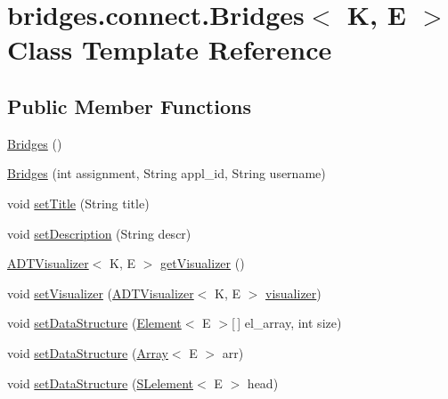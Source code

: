 \hypertarget{classbridges_1_1connect_1_1_bridges}{}\section{bridges.\+connect.\+Bridges$<$ K, E $>$ Class Template Reference}
\label{classbridges_1_1connect_1_1_bridges}
\subsection*{Public Member Functions}
\begin{DoxyCompactItemize}
\item 
\hyperlink{classbridges_1_1connect_1_1_bridges_a4925cf146eff9ff84e89351ab574795d}{Bridges} ()
\item 
\hyperlink{classbridges_1_1connect_1_1_bridges_a297e7ca95c725fa20bce0768c2d9aa64}{Bridges} (int assignment, String appl\+\_\+id, String username)
\item 
void \hyperlink{classbridges_1_1connect_1_1_bridges_a90c7f6b2b99d88bf241ea7247db47045}{set\+Title} (String title)
\item 
void \hyperlink{classbridges_1_1connect_1_1_bridges_a161206b37c2acdf435f4444679616eec}{set\+Description} (String descr)
\item 
\hyperlink{classbridges_1_1base_1_1_a_d_t_visualizer}{A\+D\+T\+Visualizer}$<$ K, E $>$ \hyperlink{classbridges_1_1connect_1_1_bridges_a7193b48c9dc01b04dfcf0d66fa2f59fb}{get\+Visualizer} ()
\item 
void \hyperlink{classbridges_1_1connect_1_1_bridges_ad627f604914734646e92fac9e7b385d8}{set\+Visualizer} (\hyperlink{classbridges_1_1base_1_1_a_d_t_visualizer}{A\+D\+T\+Visualizer}$<$ K, E $>$ \hyperlink{classbridges_1_1connect_1_1_bridges_af3fc35779b31c976ed8bf2e173310502}{visualizer})
\item 
void \hyperlink{classbridges_1_1connect_1_1_bridges_a0cc12a419997a8ef0ef54afe9e65d1e9}{set\+Data\+Structure} (\hyperlink{classbridges_1_1base_1_1_element}{Element}$<$ E $>$\mbox{[}$\,$\mbox{]} el\+\_\+array, int size)
\item 
void \hyperlink{classbridges_1_1connect_1_1_bridges_a2cd9af150b77b8337327ea67544a0e8f}{set\+Data\+Structure} (\hyperlink{classbridges_1_1base_1_1_array}{Array}$<$ E $>$ arr)
\item 
void \hyperlink{classbridges_1_1connect_1_1_bridges_ae41b3d86963350ace304d8951c1863ad}{set\+Data\+Structure} (\hyperlink{classbridges_1_1base_1_1_s_lelement}{S\+Lelement}$<$ E $>$ head)

\end{DoxyCompactItemize}
